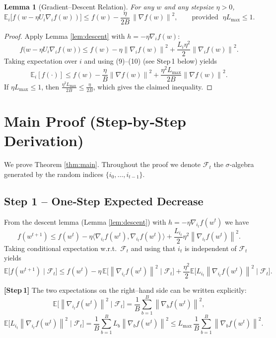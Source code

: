 \documentclass{article}
\newtheorem{lemma}{Lemma}
\newcommand{\E}{\mathbb{E}}
\newcommand{\norm}[1]{\left\lVert#1\right\rVert}
\begin{document}
\begin{lemma}[Gradient–Descent Relation]\label{lem:gdrel}
For any $w$ and any stepsize $\eta>0$,
\[
\E_{i}\!\bigl[f(w-\eta U_{i}\nabla_{i}f(w))\bigr]
\le f(w)-\frac{\eta}{2B}\,\norm{\nabla f(w)}^{2},
\qquad\text{provided }\;\eta L_{\max}\le 1 .
\tag{7}
\]
\end{lemma}
\begin{proof}
Apply Lemma \ref{lem:descent} with $h=-\eta\nabla_{i}f(w)$:
\[
f\!\bigl(w-\eta U_{i}\nabla_{i}f(w)\bigr)
\le f(w)-\eta\norm{\nabla_{i}f(w)}^{2}
+\frac{L_{i}\eta^{2}}{2}\norm{\nabla_{i}f(w)}^{2}.
\]
Taking expectation over $i$ and using (9)–(10) (see Step 1 below) yields
\[
\E_{i}[f(\cdot)]\le f(w)-\frac{\eta}{B}\norm{\nabla f(w)}^{2}
+\frac{\eta^{2}L_{\max}}{2B}\norm{\nabla f(w)}^{2}.
\]
If $\eta L_{\max}\le 1$, then $\frac{\eta^{2}L_{\max}}{2B}\le\frac{\eta}{2B}$,
which gives the claimed inequality. \qedhere
\end{proof}

\section*{Main Proof (Step‑by‑Step Derivation)}
We prove Theorem \ref{thm:main}. Throughout the proof we denote
$\mathcal{F}_{t}$ the $\sigma$‑algebra generated by the random indices
$\{i_{0},\dots ,i_{t-1}\}$.

\subsection*{Step 1 – One‑Step Expected Decrease}
From the descent lemma (Lemma \ref{lem:descent}) with $h=-\eta\nabla_{i_{t}}f(w^{t})$ we have
\[
f\!\left(w^{t+1}\right)
\le f\!\left(w^{t}\right)
-\eta\bigl\langle\nabla_{i_{t}}f(w^{t}),\nabla_{i_{t}}f(w^{t})\bigr\rangle
+\frac{L_{i_{t}}}{2}\eta^{2}\norm{\nabla_{i_{t}}f(w^{t})}^{2}.
\tag{8}
\]
Taking conditional expectation w.r.t.\ $\mathcal{F}_{t}$ and using that $i_{t}$ is
independent of $\mathcal{F}_{t}$ yields
\[
\E\!\bigl[f(w^{t+1})\mid\mathcal{F}_{t}\bigr]
\le f(w^{t})
-\eta\,\E\!\bigl[\norm{\nabla_{i_{t}}f(w^{t})}^{2}\mid\mathcal{F}_{t}\bigr]
+\frac{\eta^{2}}{2}\E\!\bigl[L_{i_{t}}\norm{\nabla_{i_{t}}f(w^{t})}^{2}\mid\mathcal{F}_{t}\bigr].
\tag{9}
\]

\textbf{[Step 1]} The two expectations on the right–hand side can be written explicitly:
\[
\E\!\bigl[\norm{\nabla_{i_{t}}f(w^{t})}^{2}\mid\mathcal{F}_{t}\bigr]
=\frac{1}{B}\sum_{b=1}^{B}\norm{\nabla_{b}f(w^{t})}^{2},
\tag{10}
\]
\[
\E\!\bigl[L_{i_{t}}\norm{\nabla_{i_{t}}f(w^{t})}^{2}\mid\mathcal{F}_{t}\bigr]
=\frac{1}{B}\sum_{b=1}^{B}L_{b}\norm{\nabla_{b}f(w^{t})}^{2}
\le L_{\max}\,\frac{1}{B}\sum_{b=1}^{B}\norm{\nabla_{b}f(w^{t})}^{2}.
\tag{11}
\]
\end{document}
